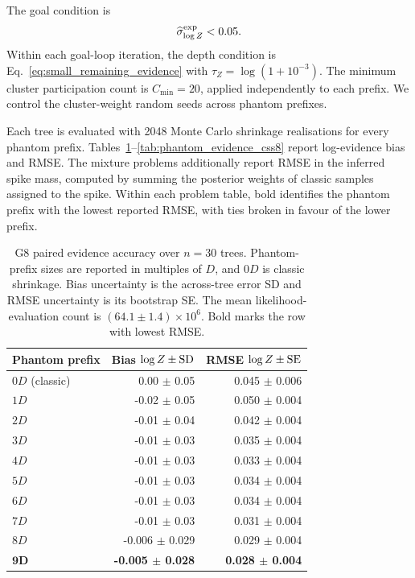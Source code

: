 \documentclass[pdflatex,sn-basic,icol]{sn-jnl}
\theoremstyle{plain}
\theoremstyle{definition}
\begin{document}
The goal condition is
\begin{align}
    \widehat\sigma^{\rm exp}_{\log Z}<0.05.
    \label{eq:benchmark_goal}
\end{align}
Within each goal-loop iteration, the depth condition is Eq.~\ref{eq:small_remaining_evidence} with $\tau_Z=\log(1+10^{-3})$.
The minimum cluster participation count is $C_{\min}=20$, applied independently to each prefix.
We control the cluster-weight random seeds across phantom prefixes.

Each tree is evaluated with 2048 Monte Carlo shrinkage realisations for every phantom prefix.
Tables~\ref{tab:phantom_evidence_g8}--\ref{tab:phantom_evidence_css8} report log-evidence bias and RMSE.
The mixture problems additionally report RMSE in the inferred spike mass, computed by summing the posterior weights of classic samples assigned to the spike.
Within each problem table, bold identifies the phantom prefix with the lowest reported RMSE, with ties broken in favour of the lower prefix.

\begin{table}[t]
\caption{G8 paired evidence accuracy over $n=30$ trees. Phantom-prefix sizes are reported in multiples of $D$, and $0D$ is classic shrinkage. Bias uncertainty is the across-tree error SD and RMSE uncertainty is its bootstrap SE. The mean likelihood-evaluation count is $(64.1\pm1.4)\times10^6$. Bold marks the row with lowest RMSE.}
\label{tab:phantom_evidence_g8}
\centering
\scriptsize
\setlength{\tabcolsep}{3.0pt}
\renewcommand{\arraystretch}{0.92}
\begin{tabular}{lrr}
\toprule
Phantom prefix & Bias $\log Z\mathbin{\pm}{\rm SD}$ & RMSE $\log Z\mathbin{\pm}{\rm SE}$ \\
\midrule
$0D$ (classic) & 0.00 $\pm$ 0.05 & 0.045 $\pm$ 0.006 \\
$1D$ & -0.02 $\pm$ 0.05 & 0.050 $\pm$ 0.004 \\
$2D$ & -0.01 $\pm$ 0.04 & 0.042 $\pm$ 0.004 \\
$3D$ & -0.01 $\pm$ 0.03 & 0.035 $\pm$ 0.004 \\
$4D$ & -0.01 $\pm$ 0.03 & 0.033 $\pm$ 0.004 \\
$5D$ & -0.01 $\pm$ 0.03 & 0.034 $\pm$ 0.004 \\
$6D$ & -0.01 $\pm$ 0.03 & 0.034 $\pm$ 0.004 \\
$7D$ & -0.01 $\pm$ 0.03 & 0.031 $\pm$ 0.004 \\
$8D$ & -0.006 $\pm$ 0.029 & 0.029 $\pm$ 0.004 \\
$\boldsymbol{9D}$ & \textbf{-0.005 $\pm$ 0.028} & \textbf{0.028 $\pm$ 0.004} \\
\bottomrule
\end{tabular}
\end{table}
\end{document}

